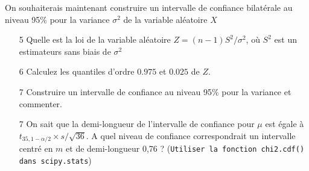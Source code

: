 \documentclass[a4paper,reqno,11pt]{article}
\begin{document}
\begin{partie}
{	\vspace{1ex}
	
On souhaiterais maintenant construire un intervalle de confiance bilatérale au niveau 95\% pour la variance $\sigma^2$ de la variable aléatoire $X$

\vspace{1ex}

\begin{itemize}
	
	\item[5] Quelle est la loi de la variable aléatoire $Z=(n-1)S^2 / \sigma^2$, où $S^2$ est un estimateurs sans biais de $\sigma^2$
	
	\item[6] Calculez les quantiles d'ordre $0.975$ et $0.025$ de $Z$.
	
	\vspace{1ex}
	
	\item[7] Construire un intervalle de confiance au niveau 95\% pour la variance et commenter.



\vspace{1ex}

\item[7] On sait que la demi-longueur
de l'intervalle de confiance pour $\mu$ est égale à 
$t_{35, 1-\alpha/2}\times  s / \sqrt{36}$. A quel niveau de confiance correspondrait un intervalle centré en $m$ et de demi-longueur 0,76 ?
(\verb|Utiliser la fonction chi2.cdf() dans scipy.stats|)  

\end{itemize}
}\end{partie}
\end{document}
